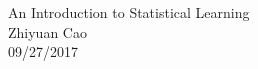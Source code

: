 \documentclass[12pt]{article}
\numberwithin{equation}{section}
\begin{document}
\begin{flushright}
	An Introduction to Statistical Learning\\
	Zhiyuan Cao \\ 
	09/27/2017  
\end{flushright}	
	









\end{document}
